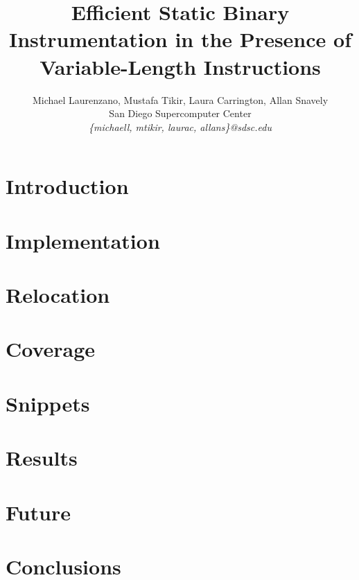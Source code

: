 \documentclass[a4paper,11pt,leqno,notitlepage,twocolumn]{article}
\begin{document}
\title{Efficient Static Binary Instrumentation in the Presence of Variable-Length Instructions}
\author{Michael Laurenzano, Mustafa Tikir, Laura Carrington, Allan Snavely\\
San Diego Supercomputer Center\\
\it{\{michaell, mtikir, laurac, allans\}@sdsc.edu}}
\date{}
\maketitle

\begin{abstract}

\end{abstract}

\label{Section:Introduction}
\section{Introduction}


\label{Section:Implementation}
\section{Implementation}
%

\label{Section:Relocation}
\section{Relocation}


\label{Section:Coverage}
\section{Coverage}


\label{Section:Snippets}
\section{Snippets}
%

\label{Section:Results}
\section{Results}
%

\label{Section:Future}
\section{Future}


\label{Section:Conclusions}
\section{Conclusions}
%



\end{document}
